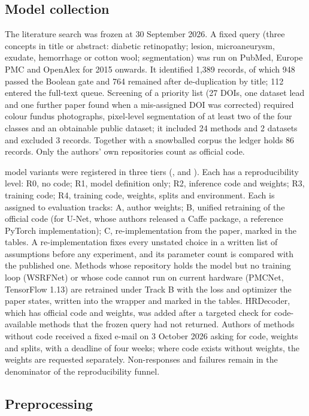 \subsection{Model collection}
The literature search was frozen at 30 September 2026. A fixed query (three concepts in title or abstract: diabetic retinopathy; lesion, microaneurysm, exudate, hemorrhage or cotton wool; segmentation) was run on PubMed, Europe PMC and OpenAlex for 2015 onwards. It identified 1,389 records, of which 948 passed the Boolean gate and 764 remained after de-duplication by title; 112 entered the full-text queue. Screening of a priority list (27 DOIs, one dataset lead and one further paper found when a mis-assigned DOI was corrected) required colour fundus photographs, pixel-level segmentation of at least two of the four classes and an obtainable public dataset; it included 24 methods and 2 datasets and excluded 3 records. Together with a snowballed corpus the ledger holds 86 records. Only the authors' own repositories count as official code.

 model variants were registered in three tiers (,  and ). Each has a reproducibility level: R0, no code; R1, model definition only; R2, inference code and weights; R3, training code; R4, training code, weights, splits and environment. Each is assigned to evaluation tracks: A, author weights; B, unified retraining of the official code (for U-Net, whose authors released a Caffe package, a reference PyTorch implementation); C, re-implementation from the paper, marked in the tables. A re-implementation fixes every unstated choice in a written list of assumptions before any experiment, and its parameter count is compared with the published one. Methods whose repository holds the model but no training loop (WSRFNet) or whose code cannot run on current hardware (PMCNet, TensorFlow 1.13) are retrained under Track B with the loss and optimizer the paper states, written into the wrapper and marked in the tables. HRDecoder, which has official code and weights, was added after a targeted check for code-available methods that the frozen query had not returned. Authors of methods without code received a fixed e-mail on 3 October 2026 asking for code, weights and splits, with a deadline of four weeks; where code exists without weights, the weights are requested separately. Non-responses and failures remain in the denominator of the reproducibility funnel.

\subsection{Preprocessing}
